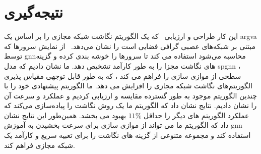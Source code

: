 \chapter{نتیجه‌گیری}
\label{section_conclusion}

این کار طراحی و ارزیابی \ourAlg\  که یک الگوریتم نگاشت شبکه مجازی را بر اساس یک \gls{argva} مبتنی بر شبکه‌های عصبی گرافی فضایی است را نشان می‌دهد.  \ourAlg\ از نمایش سرورها که توسط \gls{gnn}محاسبه می‌شود استفاده می کند  تا سرورها را خوشه بندی کرده و گزینه های نگاشت مجزا را به طور کارآمد تشخیص دهد.
%
ما نشان دادیم که مدل \gls{spgnn} ، سطحی از موازی سازی را فراهم می کند ، که به طور قابل توجهی مقیاس پذیری الگوریتم‌های نگاشت شبکه مجازی  را افزایش می دهد.
%
ما الگوریتم پیشنهادی خود را  با چندین الگوریتم موجود به طور گسترده مقایسه و ارزیابی کردیم و عملکرد و سرعت آن را نشان دادیم. نتایج نشان داد که الگوریتم ما یک روش نگاشت را پیاده‌سازی می‌کند که عملکرد الگوریتم های دیگر را حداقل $11\%$ بهبود می بخشد. همین‌طور این نتایج نشان داد که الگوریتم ما می تواند از موازی سازی برای سرعت بخشیدن به آموزش \gls{gnn} استفاده کند و مجموعه متنوعی از گزینه های نگاشت را برای تعبیه سریع و کارآمد یک شبکه مجازی فراهم کند.
%

